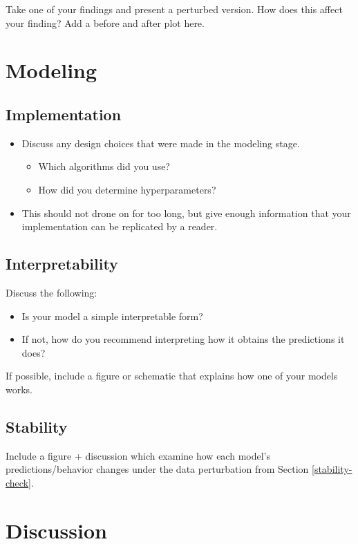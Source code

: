 \documentclass[11pt,letterpaper]{article}
\begin{document}
Take one of your findings and present a perturbed version. How does this
affect your finding? Add a before and after plot here.

\section{Modeling}

\subsection{Implementation}

\begin{itemize}
    \item Discuss any design choices that were made in the modeling stage.
    \begin{itemize}
        \item Which algorithms did you use?
        \item How did you determine hyperparameters? 
    \end{itemize}
    \item This should not drone on for too long, but give enough information that your implementation can be replicated by a reader.
\end{itemize}

\subsection{Interpretability}

Discuss the following:
\begin{itemize}
    \item Is your model a simple interpretable form?
    \item If not, how do you recommend interpreting how it
obtains the predictions it does?
\end{itemize}
If possible, include a figure or schematic that explains how one of your models works.

\subsection{Stability}

Include a figure + discussion which examine how each model's predictions/behavior changes under the data perturbation from Section \ref{stability-check}.

\section{Discussion}\label{discussion}
\end{document}
